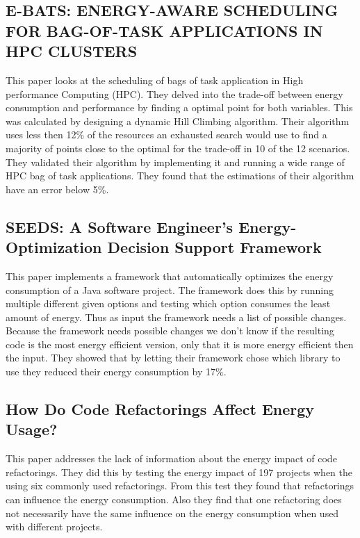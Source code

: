 \subsection{E-BATS: ENERGY-AWARE SCHEDULING FOR BAG-OF-TASK APPLICATIONS IN HPC CLUSTERS \cite{filip2015bats}}
This paper looks at the scheduling of bags of task application in High performance Computing (HPC). They delved into the trade-off between energy consumption and performance by finding a optimal point for both variables. This was calculated by designing a dynamic Hill Climbing algorithm. Their algorithm uses less then 12\% of the resources an exhausted search would use to find a majority of points close to the optimal for the trade-off in 10 of the 12 scenarios. They validated their algorithm by implementing it and running a wide range of HPC bag of task applications. They found that the estimations of their algorithm have an error below 5\%.

\subsection{SEEDS: A Software Engineer’s Energy-Optimization Decision Support Framework \cite{manotas2014seeds}}
This paper implements a framework that automatically optimizes the energy consumption of a Java software project. The framework does this by running multiple different given options and testing which option consumes the least amount of energy. Thus as input the framework needs a list of possible changes. Because the framework needs possible changes we don't know if the resulting code is the most energy efficient version, only that it is more energy efficient then the input. They showed that by letting their framework chose which library to use they reduced their energy consumption by 17\%.

\subsection{How Do Code Refactorings Affect Energy Usage? \cite{sahin2014code}}
This paper addresses the lack of information about the energy impact of code refactorings. They did this by testing the energy impact of 197 projects when the using six commonly used refactorings. From this test they found that refactorings can influence the energy consumption. Also they find that one refactoring does not necessarily have the same influence on the energy consumption when used with different projects.


